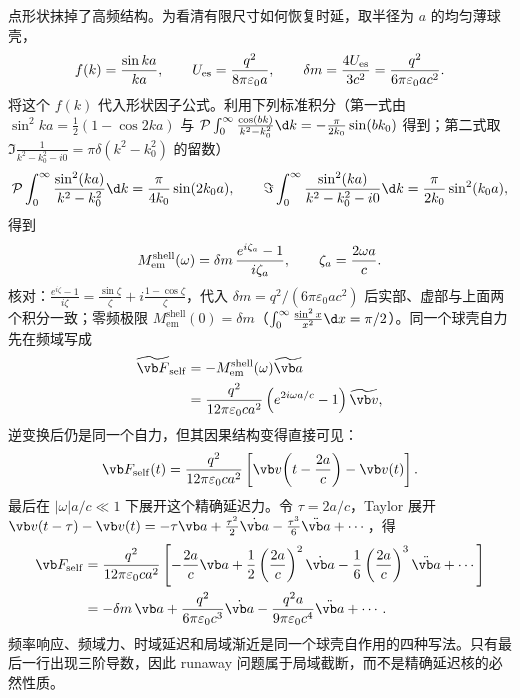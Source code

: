 点形状抹掉了高频结构。为看清有限尺寸如何恢复时延，取半径为 $a$ 的均匀薄球壳，
\begin{equation*}
 f(k)={\sin ka\over ka},
 \qquad
 U_{\mathrm{es}}={q^2\over8\pi\varepsilon_0a},
 \qquad
 \delta m={4U_{\mathrm{es}}\over3c^2}
 ={q^2\over6\pi\varepsilon_0ac^2}.
\end{equation*}
将这个 $f(k)$ 代入形状因子公式。利用下列标准积分（第一式由 $\sin^2ka=\frac12(1-\cos2ka)$ 与 $\mathcal P\int_0^\infty\frac{\cos(bk)}{k^2-k_0^2}\d k=-\frac{\pi}{2k_0}\sin(bk_0)$ 得到；第二式取 $\Im\frac{1}{k^2-k_0^2-i0}=\pi\delta(k^2-k_0^2)$ 的留数）
\begin{equation*}
 \mathcal P\int_0^\infty{\sin^2(ka)\over k^2-k_0^2}\d k
 ={\pi\over4k_0}\sin(2k_0a),
 \qquad
 \Im\int_0^\infty{\sin^2(ka)\over k^2-k_0^2-i0}\d k
 ={\pi\over2k_0}\sin^2(k_0a),
\end{equation*}
得到
\begin{equation*}
 M_{\mathrm{em}}^{\mathrm{shell}}(\omega)
 =\delta m\,{e^{i\zeta_a}-1\over i\zeta_a},
 \qquad
 \zeta_a={2\omega a\over c}.
\end{equation*}
核对：$\frac{e^{i\zeta}-1}{i\zeta}=\frac{\sin\zeta}{\zeta}+i\frac{1-\cos\zeta}{\zeta}$，代入 $\delta m=q^2/(6\pi\varepsilon_0ac^2)$ 后实部、虚部与上面两个积分一致；零频极限 $M_{\mathrm{em}}^{\mathrm{shell}}(0)=\delta m$（$\int_0^\infty\frac{\sin^2x}{x^2}\d x=\pi/2$）。同一个球壳自力先在频域写成
\begin{align*}
 \widetilde{\vb F}_{\mathrm{self}}
 &=-M_{\mathrm{em}}^{\mathrm{shell}}(\omega)\widetilde{\vb a}\\
 &={q^2\over12\pi\varepsilon_0ca^2}
 \left(e^{2i\omega a/c}-1\right)\widetilde{\vb v},
\end{align*}
逆变换后仍是同一个自力，但其因果结构变得直接可见：
\begin{equation*}
 \vb F_{\mathrm{self}}(t)
 ={q^2\over12\pi\varepsilon_0ca^2}
 \left[\vb v\!\left(t-{2a\over c}\right)-\vb v(t)\right].
\end{equation*}
最后在 $|\omega|a/c\ll1$ 下展开这个精确延迟力。令 $\tau=2a/c$，Taylor 展开 $\vb v(t-\tau)-\vb v(t)=-\tau\vb a+\frac{\tau^2}{2}\dot{\vb a}-\frac{\tau^3}{6}\ddot{\vb a}+\cdots$，得
\begin{align*}
 \vb F_{\mathrm{self}}
 &={q^2\over12\pi\varepsilon_0ca^2}
 \left[-{2a\over c}\vb a
 +{1\over2}\left({2a\over c}\right)^2\dot{\vb a}
 -{1\over6}\left({2a\over c}\right)^3\ddot{\vb a}+\cdots\right]\\
 &=-\delta m\,\vb a
 +{q^2\over6\pi\varepsilon_0c^3}\dot{\vb a}
 -{q^2a\over9\pi\varepsilon_0c^4}\ddot{\vb a}+\cdots.
\end{align*}
频率响应、频域力、时域延迟和局域渐近是同一个球壳自作用的四种写法。只有最后一行出现三阶导数，因此 runaway 问题属于局域截断，而不是精确延迟核的必然性质。

